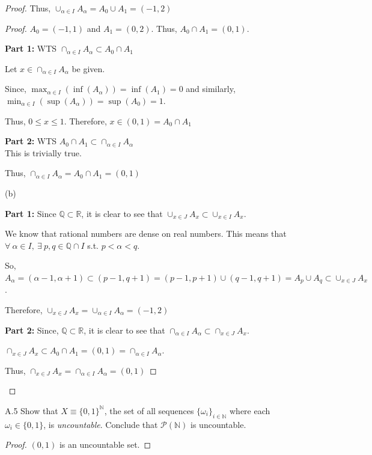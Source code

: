 \documentclass[12pt,letterpaper, onecolumn]{exam}
\newcommand{\real}{\mathbb{R}}
\newcommand{\nat}{\mathbb{N}}
\newcommand{\power}{\mathcal{P}}
\newcommand{\rational}{\mathbb{Q}}
\begin{document}
\begin{questions}
\begin{solution}
\begin{proof}
        Thus, $\cup_{\alpha\in I} A_\alpha = A_0 \cup A_1 = (-1, 2)$

        \begin{proof}
            $A_0 = (-1, 1)$ and $A_1 = (0, 2)$. Thus, $A_0 \cap A_1 = (0, 1).$

            \textbf{Part 1:} WTS   $\cap_{\alpha\in I} A_\alpha \subset  A_0 \cap A_1$

            Let $x \in \cap_{\alpha\in I} A_\alpha$ be given. 

            Since, $\max_{\alpha \in I} (\inf (A_\alpha)) = \inf(A_1) = 0$ and similarly, $\min_{\alpha \in I} (\sup (A_\alpha)) = \sup(A_0) = 1$.

            Thus, $0 \leq x \leq 1$. Therefore, $x \in (0, 1) = A_0 \cap A_1$

            \textbf{Part 2:} WTS   $A_0 \cap A_1 \subset \cap_{\alpha\in I} A_\alpha$ \\ This is trivially true. 

            Thus, $\cap_{\alpha\in I} A_\alpha = A_0 \cap A_1 = (0, 1)$

        (b) 

        \textbf{Part 1:}
        Since $\rational \subset \real$, it is clear to see that $\cup_{x\in J}A_x \subset \cup_{x\in I}A_x$.

        We know that rational numbers are dense on real numbers. This means that $\forall \: \alpha \in I, \: \exists \: p, q \in \rational \cap I$ s.t. $p < \alpha < q$.

        So, $A_\alpha = (\alpha - 1, \alpha + 1) \subset (p - 1, q + 1) = (p - 1, p+1) \cup (q - 1, q + 1) = A_p \cup A_q \subset \cup_{x \in J} A_x$. 

        Therefore, $\cup_{x \in J} A_x = \cup_{\alpha \in I} A_\alpha = (-1, 2)$

        \textbf{Part 2:}
        Since, $\rational \subset \real$, it is clear to see that $\cap_{\alpha \in I}A_\alpha \subset \cap_{x\in J}A_x$.

        $\cap_{x\in J}A_x \subset A_0 \cap A_1 = (0, 1) = \cap_{\alpha \in I} A_\alpha$.

        Thus, $\cap_{x\in J}A_x = \cap_{\alpha \in I} A_\alpha = (0, 1) $
        \end{proof}
        
    \end{proof}
    \end{solution}

    

    \question A.5 Show that $X \equiv \{0,1\}^\nat$, the set of all sequences $\{\omega_i\}_{i\in \nat}$ where each
$\omega_i \in \{0,1\}$, is \textit{uncountable}. Conclude that $\power(\nat)$ is uncountable.
    \begin{solution}
    \begin{proof}
        $(0, 1)$ is an uncountable set. 
        

\end{proof}
\end{solution}
\end{questions}
\end{document}
